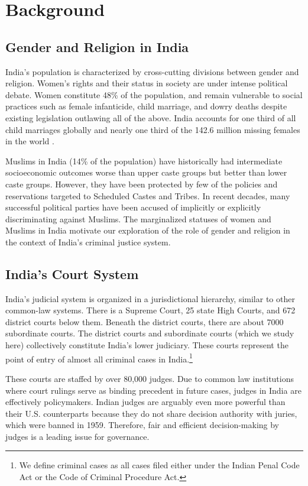 \documentclass[12pt,english]{article}
\begin{document}
\section{Background}
\label{sec:bg}

\subsection{Gender and Religion in India}

India's population is characterized by cross-cutting divisions between gender and religion. Women's rights and their status in society are under intense political debate. Women constitute 48\% of the population, and remain vulnerable to social practices such as female infanticide, child marriage, and dowry deaths despite existing legislation outlawing all of the above. India accounts for one third of all child marriages globally \citep{cousins2020} and nearly one third of the 142.6 million missing females in the world \citep{Erken2020}. 

Muslims in India (14\% of the population) have historically had intermediate socioeconomic outcomes worse than upper caste groups but better than lower caste groups. However, they have been protected by few of the policies and reservations targeted to Scheduled Castes and Tribes. In recent decades, many successful political parties have been accused of implicitly or explicitly discriminating against Muslims. The marginalized statuses of  women and Muslims in India motivate our exploration of the role of gender and religion in the context of India's criminal justice system.

\subsection{India's Court System}

India's judicial system is organized in a jurisdictional hierarchy, similar to other common-law systems. There is a Supreme Court, 25 state High Courts, and 672 district courts below them. Beneath the district courts, there are about 7000 subordinate courts. The district courts and subordinate courts (which we study here) collectively constitute India's lower judiciary. These courts represent the point of entry of almost all criminal cases in India.\footnote{We define criminal cases as all cases filed either under the Indian Penal Code Act or the Code of Criminal Procedure Act.}

These courts are staffed by over 80,000 judges. Due to common law institutions where court rulings serve as binding precedent in future cases, judges in India are effectively policymakers. Indian judges are arguably even more powerful than their U.S. counterparts because they do not share decision authority with juries, which were banned in 1959. Therefore, fair and efficient decision-making by judges is a leading issue for governance. 
\end{document}
